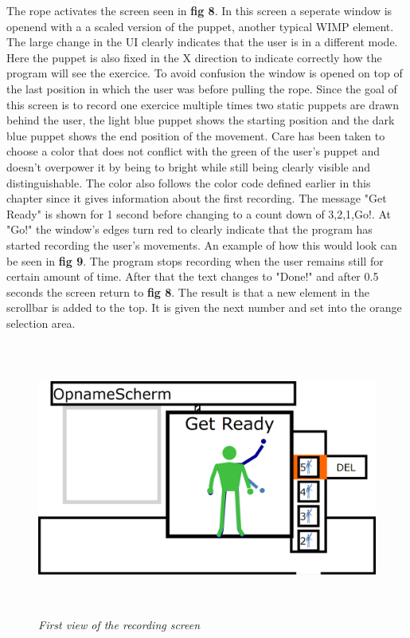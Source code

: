 The rope activates the screen seen in \textbf{ fig 8}. In this screen a seperate window is openend with a a scaled version of the puppet, another typical WIMP element. The large change in the UI clearly indicates that the user is in a different mode. Here the puppet is also fixed in the X direction to indicate correctly how the program will see the exercice. To avoid confusion the window is opened on top of the last position in which the user was before pulling the rope. Since the goal of this screen is to record one exercice multiple times two static puppets are drawn behind the user, the light blue puppet shows the starting position and the dark blue puppet shows the end position of the movement. Care has been taken to choose a color that does not conflict with the green of the user's puppet and doesn't overpower it by being to bright while still being clearly visible and distinguishable. The color also follows the color code defined earlier in this chapter since it gives information about the first recording. The message "Get Ready" is shown for 1 second before changing to a count down of 3,2,1,Go!. At "Go!" the window's edges turn red to clearly indicate that the program has started recording the user's movements. An example of how this would look can be seen in \textbf{ fig 9}. The program stops recording when the user remains still for certain amount of time. After that the text changes to "Done!" and after 0.5 seconds the screen return to \textbf{ fig 8}. The result is that a new element in the scrollbar is added to the top. It is given the next number and set into the orange selection area.\\



\begin{figure}[H]
	\begin{center}
		\includegraphics[width=16cm, height=9cm]{figures/4_record_getready.png}
		\caption{\emph{First view of the recording screen}}
		\label{The regular view of the end desing of the UI}
	\end{center}
\end{figure}

